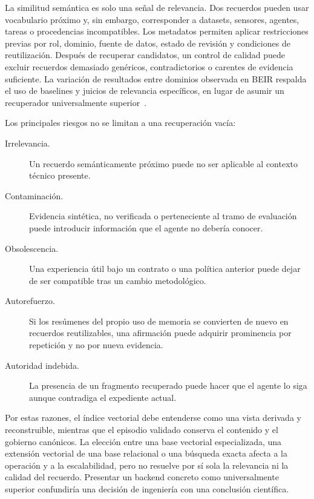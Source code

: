 La similitud semántica es solo una señal de relevancia. Dos recuerdos pueden
usar vocabulario próximo y, sin embargo, corresponder a datasets, sensores,
agentes, tareas o procedencias incompatibles. Los metadatos permiten aplicar
restricciones previas por rol, dominio, fuente de datos, estado de revisión y
condiciones de reutilización. Después de recuperar candidatos, un control de
calidad puede excluir recuerdos demasiado genéricos, contradictorios o carentes
de evidencia suficiente. La variación de resultados entre dominios observada
en BEIR respalda el uso de baselines y juicios de relevancia específicos, en
lugar de asumir un recuperador universalmente superior~\cite{thakur2021_beir}.

Los principales riesgos no se limitan a una recuperación vacía:

\begin{description}
  \item[Irrelevancia.] Un recuerdo semánticamente próximo puede no ser
        aplicable al contexto técnico presente.
  \item[Contaminación.] Evidencia sintética, no verificada o perteneciente al
        tramo de evaluación puede introducir información que el agente no
        debería conocer.
  \item[Obsolescencia.] Una experiencia útil bajo un contrato o una política
        anterior puede dejar de ser compatible tras un cambio metodológico.
  \item[Autorefuerzo.] Si los resúmenes del propio uso de memoria se convierten
        de nuevo en recuerdos reutilizables, una afirmación puede adquirir
        prominencia por repetición y no por nueva evidencia.
  \item[Autoridad indebida.] La presencia de un fragmento recuperado puede hacer
        que el agente lo siga aunque contradiga el expediente actual.
\end{description}

Por estas razones, el índice vectorial debe entenderse como una vista derivada y
reconstruible, mientras que el episodio validado conserva el contenido y el
gobierno canónicos. La elección entre una base vectorial especializada, una
extensión vectorial de una base relacional o una búsqueda exacta afecta a la
operación y a la escalabilidad, pero no resuelve por sí sola la relevancia ni la
calidad del recuerdo. Presentar un backend concreto como universalmente superior
confundiría una decisión de ingeniería con una conclusión científica.

